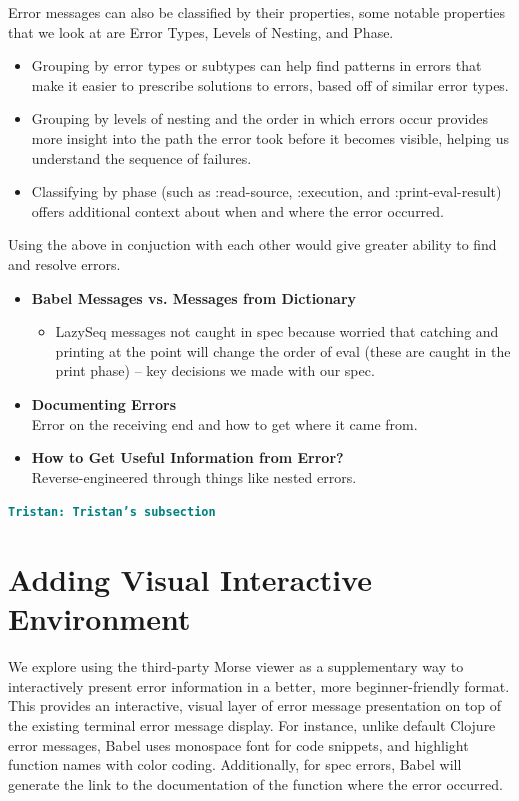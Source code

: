 \documentclass[12pt]{article}
\newcommand{\comment}[1]{{\bf \tt  {#1}}}
\newcommand{\tkcomment}[1]{\textcolor{Teal}{\comment{Tristan: {#1}}}}
\begin{document}
Error messages can also be classified by their properties, some notable properties that we look at are Error Types, Levels of Nesting, and Phase.
\begin{itemize}
	\item Grouping by error types or subtypes can help find patterns in errors that make it easier to prescribe solutions to errors, based off of similar error types.
	\item Grouping by levels of nesting and the order in which errors occur provides more insight into the path the error took before it becomes visible, helping us understand the sequence of failures.
	\item Classifying by phase (such as :read-source, :execution, and :print-eval-result) offers additional context about when and where the error occurred.
\end{itemize}
Using the above in conjuction with each other would give greater ability to find and resolve errors.

\begin{itemize}

    \item \textbf{Babel Messages vs. Messages from Dictionary} \\
    \begin{itemize}
        \item LazySeq messages not caught in spec because worried that catching and printing at the point will change the order of eval (these are caught in the print phase) -- key decisions we made with our spec.
    \end{itemize}

    \item \textbf{Documenting Errors} \\
    Error on the receiving end and how to get where it came from.

    \item \textbf{How to Get Useful Information from Error?} \\
    Reverse-engineered through things like nested errors.

\end{itemize}
\tkcomment{Tristan's subsection}

\section{Adding Visual Interactive Environment}\label{sec:interactive}

We explore using the third-party Morse viewer as a supplementary way to interactively present error information in a better, more beginner-friendly format.
This provides an interactive, visual layer of error message presentation on top of the existing terminal error message display.
For instance, unlike default Clojure error messages, Babel uses monospace font for code snippets, and highlight function names with color coding. 
Additionally, for spec errors, Babel will generate the link to the documentation of the function where the error occurred.
\end{document}
